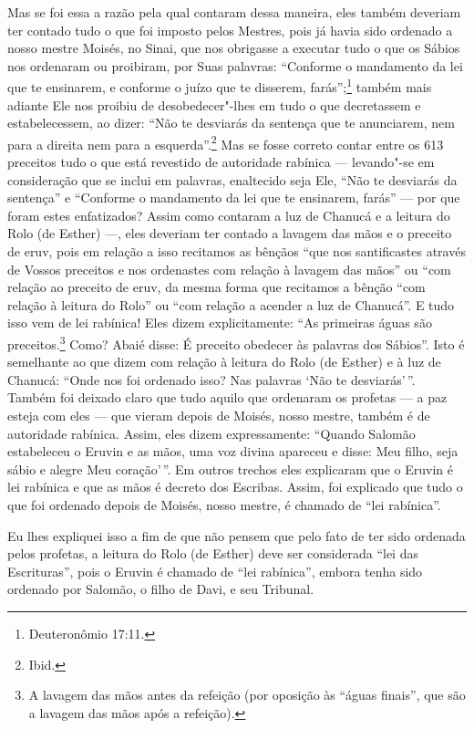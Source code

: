 Mas se foi essa a razão pela qual contaram dessa maneira, eles também
deveriam ter contado tudo o que foi imposto pelos Mestres, pois já havia
sido ordenado a nosso mestre Moisés, no Sinai, que nos obrigasse a
executar tudo o que os Sábios nos ordenaram ou proibiram, por Suas
palavras: ``Conforme o mandamento da lei que te ensinarem, e conforme o
juízo que te disserem, farás'';\footnote{Deuteronômio 17:11.} também mais
adiante Ele nos proibiu de desobedecer"-lhes em tudo o que decretassem e
estabelecessem, ao dizer: ``Não te desviarás da sentença que te
anunciarem, nem para a direita nem para a esquerda''.\footnote{Ibid.} Mas se
fosse correto contar entre os 613 preceitos tudo o que está revestido de
autoridade rabínica --- levando"-se em consideração que se inclui em
palavras, enaltecido seja Ele, ``Não te desviarás da sentença'' e
``Conforme o mandamento da lei que te ensinarem, farás'' --- por que
foram estes enfatizados? Assim como contaram a luz de Chanucá\starr{} e a
leitura do Rolo (de Esther) ---, eles deveriam ter contado a lavagem das
mãos e o preceito de eruv\starr, pois em relação a
isso recitamos as bênçãos ``que nos santificastes
através de Vossos preceitos e nos ordenastes com relação à lavagem das
mãos'' ou ``com relação ao preceito de eruv\starr, da mesma forma que
recitamos a bênção ``com relação à leitura do Rolo'' ou ``com relação a
acender a luz de Chanucá\starr''. E tudo isso vem de lei rabínica! Eles
dizem explicitamente: ``As primeiras águas são
preceitos.\footnote{A lavagem das mãos antes da refeição (por oposição às ``águas
  finais'', que são a lavagem das mãos após a refeição).} Como? Abaié\starr{} disse: É preceito obedecer às
palavras dos Sábios''. Isto é semelhante ao que dizem com relação à
leitura do Rolo (de Esther) e à luz de Chanucá\starr: ``Onde nos foi ordenado
isso? Nas palavras `Não te desviarás'\,''. Também foi deixado claro que
tudo aquilo que ordenaram os profetas --- a paz esteja com eles --- que
vieram depois de Moisés, nosso mestre, também é de autoridade rabínica.
Assim, eles dizem expressamente: ``Quando Salomão estabeleceu o Eruvin\starr{}
e as mãos, uma voz divina apareceu e disse: Meu
filho, seja sábio e alegre Meu coração'\,''. Em outros trechos eles
explicaram que o Eruvin\starr{} é lei rabínica e que as
mãos é decreto dos Escribas. Assim, foi explicado
que tudo o que foi ordenado depois de Moisés, nosso mestre, é chamado de
``lei rabínica''.

Eu lhes expliquei isso a fim de que não pensem que pelo fato de ter sido
ordenada pelos profetas, a leitura do Rolo (de Esther) deve ser
considerada ``lei das Escrituras'', pois o Eruvin\starr{} é chamado de
``lei rabínica'', embora tenha sido ordenado por Salomão, o filho de
Davi, e seu Tribunal.

